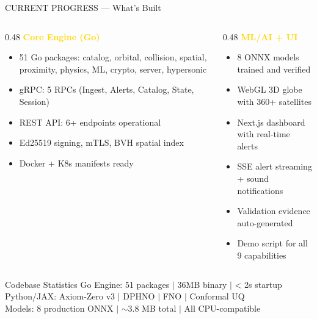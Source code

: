 \documentclass[aspectratio=169,11pt]{beamer}
\begin{document}
\begin{frame}{CURRENT PROGRESS — What's Built}
\begin{columns}[T]
  \begin{column}{0.48\textwidth}
    \textcolor{gold}{\textbf{Core Engine (Go)}}
    \begin{itemize}\small
      \item 51 Go packages: catalog, orbital, collision, spatial, proximity, physics, ML, crypto, server, hypersonic
      \item gRPC: 5 RPCs (Ingest, Alerts, Catalog, State, Session)
      \item REST API: 6+ endpoints operational
      \item Ed25519 signing, mTLS, BVH spatial index
      \item Docker + K8s manifests ready
    \end{itemize}
  \end{column}
  \begin{column}{0.48\textwidth}
    \textcolor{gold}{\textbf{ML/AI + UI}}
    \begin{itemize}\small
      \item 8 ONNX models trained and verified
      \item WebGL 3D globe with 360+ satellites
      \item Next.js dashboard with real-time alerts
      \item SSE alert streaming + sound notifications
      \item Validation evidence auto-generated
      \item Demo script for all 9 capabilities
    \end{itemize}
  \end{column}
\end{columns}

\vspace{0.3cm}
\begin{block}{Codebase Statistics}
\small
Go Engine: 51 packages \(\vert\) 36MB binary \(\vert\) < 2s startup\\
Python/JAX: Axiom-Zero v3 \(\vert\) DPHNO \(\vert\) FNO \(\vert\) Conformal UQ\\
Models: 8 production ONNX \(\vert\) $\sim$3.8 MB total \(\vert\) All CPU-compatible
\end{block}
\end{frame}
\end{document}
